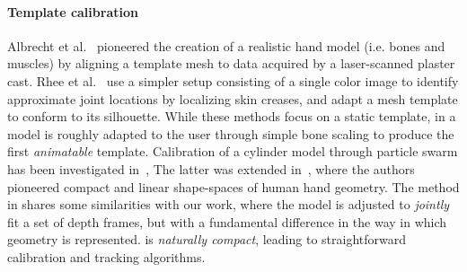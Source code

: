 
\paragraph{Template calibration}
Albrecht et al.~ pioneered the creation of a realistic hand model (i.e. bones and muscles) by aligning a template mesh to data acquired by a laser-scanned plaster cast. Rhee et al.~ use a simpler setup consisting of a single color image to identify approximate joint locations by localizing skin creases, and adapt a mesh template to conform to its silhouette. While these methods focus on a static template, in \cite{delagorce2011model} a model is roughly adapted to the user through simple bone scaling to produce the first \emph{animatable} template. 
% 
Calibration of a cylinder model through particle swarm has been investigated in~\cite{makris2015adapt}, 
% 
The latter was extended in~\cite{khamis15learning}, where the authors pioneered compact and linear shape-spaces of human hand geometry.
% 
The method in \cite{taylor2014user} shares some similarities with our work, where the model is adjusted to \emph{jointly} fit a set of depth frames, but with a fundamental difference in the way in which geometry is represented.  is \emph{naturally compact}, leading to straightforward calibration and tracking algorithms.

